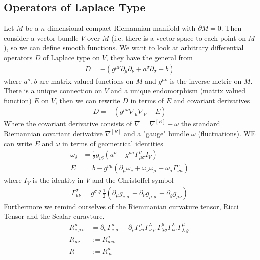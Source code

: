 \subsection{Operators of Laplace Type}
Let $M$ be a $n$ dimensional compact Riemannian manifold with $\partial M = 0$.
Then consider a vector bundle $V$ over $M$ (i.e. there is a vector space to
each point on $M$), so we can define smooth functions. We want to look at
arbitrary differential operators $D$ of Laplace type on $V$, they have the general
from
\begin{align}
    D = -(g^{\mu\nu} \partial_\mu\partial_\nu + a^\sigma\partial_\sigma +b)
\end{align}
where $a^\sigma, b$ are matrix valued functions on $M$ and $g^{\mu\nu}$ is the
inverse metric on $M$. There is a unique connection on $V$ and a unique
endomorphism (matrix valued function) $E$ on $V$, then we can rewrite $D$ in
terms of $E$ and covariant derivatives
\begin{align}
    D = -(g^{\mu\nu} \nabla_\mu \nabla_\nu +E)
\end{align}
Where the covariant derivative consists of $\nabla = \nabla^{[R]} +\omega$ the
standard Riemannian covariant derivative $\nabla^{[R]}$ and a "gauge" bundle
$\omega$ (fluctuations). WE can write $E$ and $\omega$ in terms of geometrical
identities
\begin{align}
    \omega_\delta &= \frac{1}{2}g_{\nu\delta}(a^\nu
    +g^{\mu\sigma}\Gamma^\nu_{\mu\sigma}I_V)\\
    E &= b - g^{\nu\mu}(\partial_\mu \omega_\nu + \omega_\nu \omega_\mu -
    \omega_\sigma \Gamma^\sigma_{\nu\mu})
\end{align}
where $I_V$ is the identity in $V$ and the Christoffel symbol
\begin{align}
    \Gamma^\sigma_{\mu\nu} = g^{\sigma\varrho} \frac{1}{2} (\partial_\mu
    g_{\nu\varrho} + \partial_\nu g_{\mu\varrho} - \partial_\varrho g_{\mu\nu})
\end{align}
Furthermore we remind ourselves of the Riemmanian curvature tensor, Ricci
Tensor and the Scalar curavture.
\begin{align}
    R^\mu_{\nu\varrho\sigma} &= \partial_\sigma \Gamma^{\mu}_{\nu\varrho}
    -\partial_\varrho \Gamma^\mu_{\nu\sigma}
    \Gamma^{\lambda}_{\nu\varrho}\Gamma^{\mu}_{\lambda\sigma}
    \Gamma^{\lambda}_{\nu\sigma}\Gamma^{\mu}_{\lambda\varrho}\\
    R_{\mu\nu} &:= R^{\sigma}_{\mu\nu\sigma}\\
    R &:= R^\mu_{\ \mu}
\end{align}

